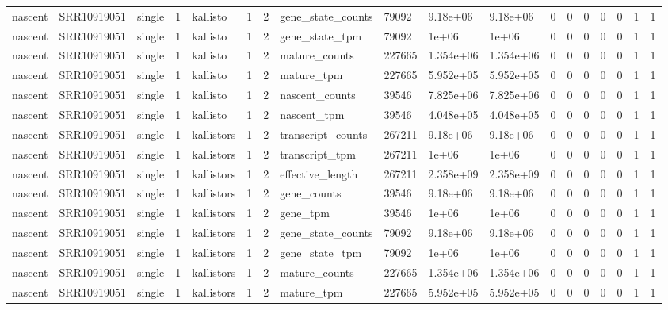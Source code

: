 \begin{tabular}{llllllllllllllllll}
nascent & SRR10919051 & single & 1 & kallisto & 1 & 2 & gene\_state\_counts & 79092 & 9.18e+06 & 9.18e+06 & 0 & 0 & 0 & 0 & 0 & 1 & 1 \\
nascent & SRR10919051 & single & 1 & kallisto & 1 & 2 & gene\_state\_tpm & 79092 & 1e+06 & 1e+06 & 0 & 0 & 0 & 0 & 0 & 1 & 1 \\
nascent & SRR10919051 & single & 1 & kallisto & 1 & 2 & mature\_counts & 227665 & 1.354e+06 & 1.354e+06 & 0 & 0 & 0 & 0 & 0 & 1 & 1 \\
nascent & SRR10919051 & single & 1 & kallisto & 1 & 2 & mature\_tpm & 227665 & 5.952e+05 & 5.952e+05 & 0 & 0 & 0 & 0 & 0 & 1 & 1 \\
nascent & SRR10919051 & single & 1 & kallisto & 1 & 2 & nascent\_counts & 39546 & 7.825e+06 & 7.825e+06 & 0 & 0 & 0 & 0 & 0 & 1 & 1 \\
nascent & SRR10919051 & single & 1 & kallisto & 1 & 2 & nascent\_tpm & 39546 & 4.048e+05 & 4.048e+05 & 0 & 0 & 0 & 0 & 0 & 1 & 1 \\
nascent & SRR10919051 & single & 1 & kallistors & 1 & 2 & transcript\_counts & 267211 & 9.18e+06 & 9.18e+06 & 0 & 0 & 0 & 0 & 0 & 1 & 1 \\
nascent & SRR10919051 & single & 1 & kallistors & 1 & 2 & transcript\_tpm & 267211 & 1e+06 & 1e+06 & 0 & 0 & 0 & 0 & 0 & 1 & 1 \\
nascent & SRR10919051 & single & 1 & kallistors & 1 & 2 & effective\_length & 267211 & 2.358e+09 & 2.358e+09 & 0 & 0 & 0 & 0 & 0 & 1 & 1 \\
nascent & SRR10919051 & single & 1 & kallistors & 1 & 2 & gene\_counts & 39546 & 9.18e+06 & 9.18e+06 & 0 & 0 & 0 & 0 & 0 & 1 & 1 \\
nascent & SRR10919051 & single & 1 & kallistors & 1 & 2 & gene\_tpm & 39546 & 1e+06 & 1e+06 & 0 & 0 & 0 & 0 & 0 & 1 & 1 \\
nascent & SRR10919051 & single & 1 & kallistors & 1 & 2 & gene\_state\_counts & 79092 & 9.18e+06 & 9.18e+06 & 0 & 0 & 0 & 0 & 0 & 1 & 1 \\
nascent & SRR10919051 & single & 1 & kallistors & 1 & 2 & gene\_state\_tpm & 79092 & 1e+06 & 1e+06 & 0 & 0 & 0 & 0 & 0 & 1 & 1 \\
nascent & SRR10919051 & single & 1 & kallistors & 1 & 2 & mature\_counts & 227665 & 1.354e+06 & 1.354e+06 & 0 & 0 & 0 & 0 & 0 & 1 & 1 \\
nascent & SRR10919051 & single & 1 & kallistors & 1 & 2 & mature\_tpm & 227665 & 5.952e+05 & 5.952e+05 & 0 & 0 & 0 & 0 & 0 & 1 & 1 \\

\end{tabular}
